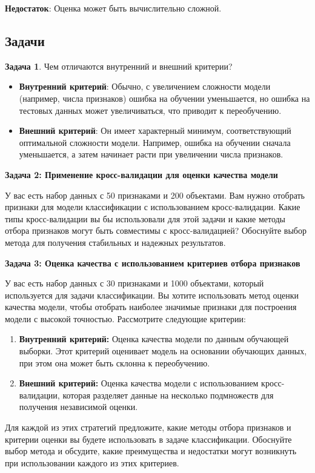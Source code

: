    \textbf{Недостаток}: Оценка может быть вычислительно сложной.
\subsection{Задачи}
\textbf{Задача 1}.
Чем отличаются внутренний и внешний критерии?
\begin{itemize}
  \item \textbf{Внутренний критерий}: Обычно, с увеличением сложности модели (например, числа признаков) ошибка на обучении уменьшается, но ошибка на тестовых данных может увеличиваться, что приводит к переобучению.
  \item \textbf{Внешний критерий}: Он имеет характерный минимум, соответствующий оптимальной сложности модели. Например, ошибка на обучении сначала уменьшается, а затем начинает расти при увеличении числа признаков.
\end{itemize}

\textbf{Задача 2: Применение кросс-валидации для оценки качества модели}

У вас есть набор данных с 50 признаками и 200 объектами. Вам нужно отобрать признаки для модели классификации с использованием кросс-валидации. Какие типы кросс-валидации вы бы использовали для этой задачи и какие методы отбора признаков могут быть совместимы с кросс-валидацией? Обоснуйте выбор метода для получения стабильных и надежных результатов.

\textbf{Задача 3: Оценка качества с использованием критериев отбора признаков}

У вас есть набор данных с 30 признаками и 1000 объектами, который используется для задачи классификации. Вы хотите использовать метод оценки качества модели, чтобы отобрать наиболее значимые признаки для построения модели с высокой точностью. Рассмотрите следующие критерии:

\begin{enumerate}
    \item \textbf{Внутренний критерий:} Оценка качества модели по данным обучающей выборки. Этот критерий оценивает модель на основании обучающих данных, при этом она может быть склонна к переобучению.
    \item \textbf{Внешний критерий:} Оценка качества модели с использованием кросс-валидации, которая разделяет данные на несколько подмножеств для получения независимой оценки.
\end{enumerate}

Для каждой из этих стратегий предложите, какие методы отбора признаков и критерии оценки вы будете использовать в задаче классификации. Обоснуйте выбор метода и обсудите, какие преимущества и недостатки могут возникнуть при использовании каждого из этих критериев.

